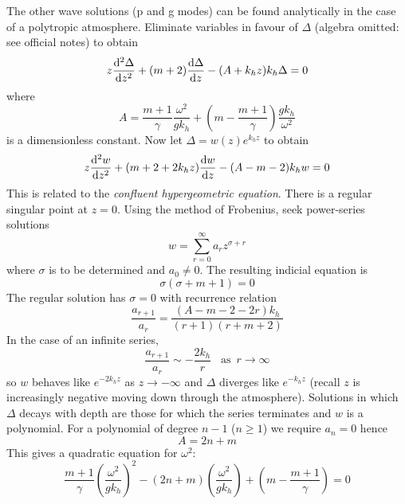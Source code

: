 \documentclass{jknotes}
\begin{document}
The other wave solutions (p and g modes) can be found analytically in the
case of a polytropic atmosphere. Eliminate variables in favour of $\Delta$
(algebra omitted: see official notes) to obtain
\begin{equation}
	z \frac{\diffd^2 \Delta}{\diffd z^2} + (m+2) \frac{\diffd \Delta}{\diffd
	z} - (A + k_h z)k_h \Delta = 0
\end{equation}
where
\begin{equation}
	A = \frac{m+1}{\gamma} \frac{\omega^2}{gk_h} + \left( m -
	\frac{m+1}{\gamma}\right) \frac{gk_h}{\omega^2}
\end{equation}
is a dimensionless constant. Now let $\Delta = w(z) e^{k_h z}$ to obtain
\begin{equation}
	z \frac{\diffd^2 w}{\diffd z^2} + (m+2+2k_h z) \frac{\diffd w}{\diffd z} -
	(A-m-2)k_h w = 0
\end{equation}
This is related to the \emph{confluent hypergeometric equation}. There is a
regular singular point at $z=0$. Using the method of Frobenius, seek
power-series solutions
\begin{equation}
	w = \sum_{r=0}^\infty a_r z^{\sigma + r}
\end{equation}
where $\sigma$ is to be determined and $a_0 \ne 0$. The resulting indicial
equation is
\begin{equation}
	\sigma (\sigma + m + 1) = 0
\end{equation}
The regular solution has $\sigma = 0$ with recurrence relation
\begin{equation}
	\frac{a_{r+1}}{a_r} = \frac{(A-m-2-2r)k_h}{(r+1)(r+m+2)}
\end{equation}
In the case of an infinite series,
\begin{equation}
	\frac{a_{r+1}}{a_r} \sim -\frac{2k_h}{r} \,\,\,\,\, \text{as}\,\,\, r \to
	\infty
\end{equation}
so $w$ behaves like $e^{-2k_h z}$ as $z \to -\infty$ and $\Delta$ diverges
like $e^{-k_h z}$ (recall $z$ is increasingly negative moving down through the
atmosphere). Solutions in which $\Delta$ decays with depth are those for which
the series terminates and $w$ is a polynomial. For a polynomial of degree
$n-1$ ($n \ge 1$) we require $a_n = 0$ hence
\begin{equation}
	A = 2n+m
\end{equation}
This gives a quadratic equation for $\omega^2$:
\begin{equation}
	\frac{m+1}{\gamma} \left(\frac{\omega^2}{gk_h}\right)^2 -
	(2n+m)\left(\frac{\omega^2}{gk_h}\right) +
	\left(m-\frac{m+1}{\gamma}\right) = 0
\end{equation}
\end{document}
